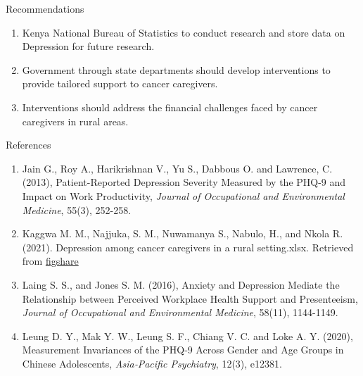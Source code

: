 \documentclass{beamer}
\newcounter{saveenumi}
\newcommand{\seti}{\setcounter{saveenumi}{\value{enumi}}}
\numberwithin{equation}{section}
\numberwithin{table}{section}
\begin{document}
\begin{frame}{Recommendations}
\begin{enumerate}
\item Kenya National Bureau  of Statistics to conduct research and store data on Depression for future research.

\item Government through state departments should develop interventions to provide tailored support to cancer caregivers. 

\item Interventions should address the financial challenges faced by cancer caregivers in rural areas.
\end{enumerate}
\end{frame}
\begin{frame}{References}
	\begin{enumerate}
\item Jain G., Roy A., Harikrishnan V., Yu S., Dabbous O. and Lawrence, C. (2013), Patient-Reported Depression Severity Measured by the PHQ-9 and Impact on Work Productivity, \emph{Journal of Occupational and Environmental Medicine}, 55(3), 252-258.
\item Kaggwa M. M., Najjuka, S. M., Nuwamanya S., Nabulo, H., and Nkola R. (2021). Depression among cancer caregivers in a rural setting.xlsx. Retrieved from
\href{https://figshare.com/articles/dataset/Depressionamongcancercaregiversinaruralsettingxlsx/doi: 10.6084/m9.figshare.14524800.v1}{figshare}

\item Laing S. S., and Jones S. M. (2016), Anxiety and Depression Mediate the Relationship between Perceived Workplace Health Support and Presenteeism, \emph{Journal of Occupational and Environmental Medicine}, 58(11), 1144-1149.

\item Leung D. Y., Mak Y. W., Leung S. F., Chiang V. C. and Loke A. Y. (2020), Measurement Invariances of the PHQ‐9 Across Gender and Age Groups in Chinese Adolescents,\emph{ Asia‐Pacific Psychiatry}, 12(3), e12381.
\seti
\end{enumerate}
\end{frame}
\end{document}
